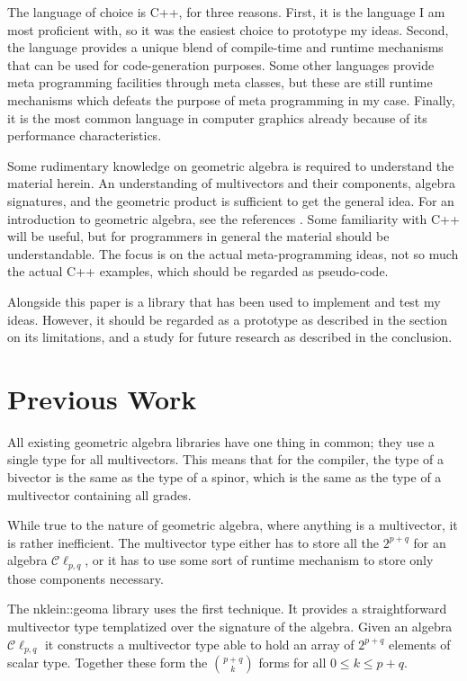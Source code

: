 \documentclass[10pt]{article}
\begin{document}
The language of choice is C++, for three reasons. First, it is the language I am most proficient with, so it was the easiest choice to prototype my ideas. Second, the language provides a unique blend of compile-time and runtime mechanisms that can be used for code-generation purposes. Some other languages provide meta programming facilities through meta classes, but these are still runtime mechanisms which defeats the purpose of meta programming in my case. Finally, it is the most common language in computer graphics already because of its performance characteristics. 

Some rudimentary knowledge on geometric algebra is required to understand the material herein. An understanding of multivectors and their components, algebra signatures, and the geometric product is sufficient to get the general idea. For an introduction to geometric algebra, see the references \cite{bib:primer}
\cite{bib:dorst honing geometric algebra} \cite{bib:hestenes new foundations}. Some familiarity with C++ will be useful, but for programmers in general the material should be understandable. The focus is on the actual meta-programming ideas, not so much the actual C++ examples, which should be regarded as pseudo-code.

Alongside this paper is a library \cite{bib:clifford} that has been used to implement and test my ideas. However, it should be regarded as a prototype as described in the section on its limitations, and a study for future research as described in the conclusion.

\section{Previous Work}

All existing geometric algebra libraries have one thing in common; they use a single type for all multivectors. This means that for the compiler, the type of a bivector is the same as the type of a spinor, which is the same as the type of a multivector containing all grades.

While true to the nature of geometric algebra, where anything is a multivector, it is rather inefficient. The multivector type either has to store all the $2^{p+q}$ for an algebra $\mathcal{C}\ell_{p,q}$, or it has to use some sort of runtime mechanism to store only those components necessary.

The nklein::geoma \cite{bib:nklein} library uses the first technique. It provides a straightforward multivector type templatized over the signature of the algebra. Given an algebra $\mathcal{C}\ell_{p,q}$ it constructs a multivector type able to hold an array of $2^{p+q}$ elements of scalar type. Together these
form the $\binom{p+q}{k}$ forms for all $0 \leq k \leq p+q$.
\end{document}

